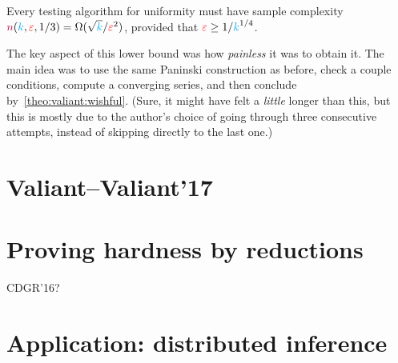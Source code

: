 \begin{theorem}
  \label{prop:uniformity:lb:valiant}
Every testing algorithm for uniformity must have sample complexity ${\textcolor{purple}{n}}({\textcolor{cyan}{k}},\textcolor{red}{\varepsilon},1/3) = \Omega(\sqrt{{\textcolor{cyan}{k}}}/\textcolor{red}{\varepsilon}^2)$, provided that $\textcolor{red}{\varepsilon} \geq 1/{\textcolor{cyan}{k}}^{1/4}$.
\end{theorem}
The key aspect of this lower bound was how \emph{painless} it was to obtain it. The main idea was to use the same Paninski construction as before, check a couple conditions, compute a converging series, and then conclude by~\cref{theo:valiant:wishful}. (Sure, it might have felt a \emph{little} longer than this, but this is mostly due to the author's choice of going through three consecutive attempts, instead of skipping directly to the last one.)


\section{Valiant--Valiant'17}
\section{Proving hardness by reductions}
CDGR'16?
\section{Application: distributed inference}
